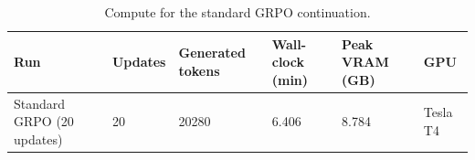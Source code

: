 \begin{table}[t]
\centering
\small
\caption{Compute for the standard GRPO continuation.}
\begin{tabular}{llllll}
\toprule
Run & Updates & Generated tokens & Wall-clock (min) & Peak VRAM (GB) & GPU \\
\midrule
Standard GRPO (20 updates) & 20 & 20280 & 6.406 & 8.784 & Tesla T4 \\
\bottomrule
\end{tabular}
\end{table}
